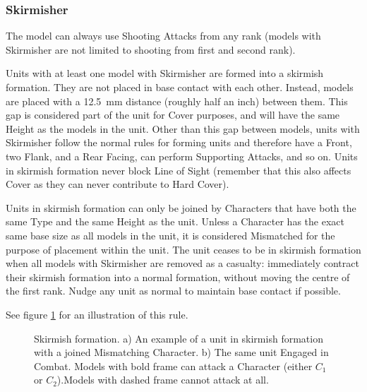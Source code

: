 \subsubsection{Skirmisher}
\idx[main=y]{\skirmisher}\label{skirmisher}

The model can always use Shooting Attacks from any rank (models with Skirmisher are not limited to shooting from first and second rank).

Units with at least one \rnf{} model with Skirmisher are formed into a skirmish formation. They are not placed in base contact with each other. Instead, models are placed with a \SI{12.5}{\milli\meter} distance (roughly half an inch) between them. This gap is considered part of the unit for Cover purposes, and will have the same Height as the models in the unit. Other than this gap between models, units with Skirmisher follow the normal rules for forming units and therefore have a Front, two Flank, and a Rear Facing, can perform Supporting Attacks, and so on. Units in skirmish formation never block Line of Sight (remember that this also affects Cover as they can never contribute to Hard Cover).

Units in skirmish formation can only be joined by Characters that have both the same Type and the same Height as the unit. Unless a Character has the exact same base size as all \rnf{} models in the unit, it is considered Mismatched for the purpose of placement within the unit. The unit ceases to be in skirmish formation when all \rnf{} models with Skirmisher are removed as a casualty: immediately contract their skirmish formation into a normal formation, without moving the centre of the first rank. Nudge any unit as normal to maintain base contact if possible.

See figure \ref{figure/skirmisher} for an illustration of this rule.

\newcommand{\figSkirmiA}{a)}
\newcommand{\figSkirmiB}{b)}
\newcommand{\figSkirmiDist}{\normalfontsize \SI{12.5}{\milli\meter}}
\newcommand{\figSkirmiCharOne}{$C_{1}$}
\newcommand{\figSkirmiCharTwo}{$C_{2}$}

\begin{figure}[!htbp]
\centering
\def\svgwidth{\textwidth}

\caption{Skirmish formation.\captionpar
a) An example of a unit in skirmish formation with a joined Mismatching Character.\captionpar
b) The same unit Engaged in Combat. Models with bold frame can attack a Character (either $C_{1}$ or $C_{2}$).\newline Models with dashed frame cannot attack at all.}
\label{figure/skirmisher}
\end{figure}

